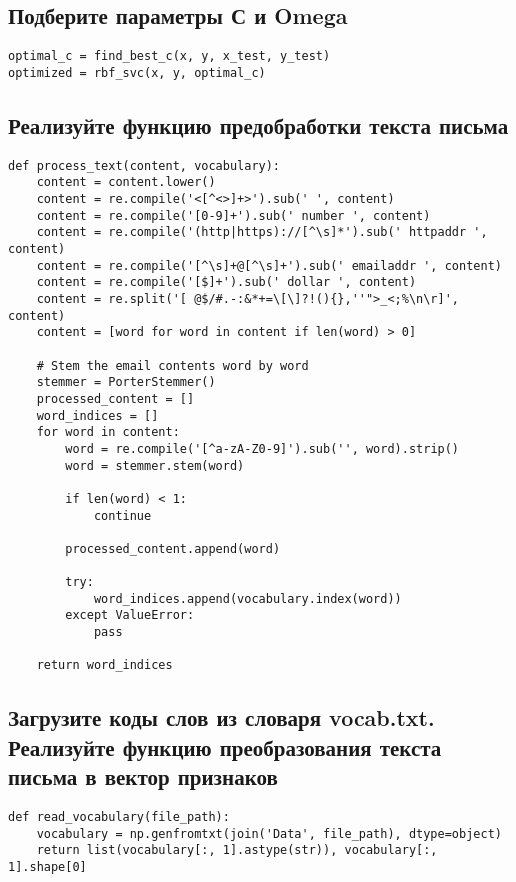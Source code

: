 \subsection{Подберите параметры С и Omega}

\begin{lstlisting}
optimal_c = find_best_c(x, y, x_test, y_test)
optimized = rbf_svc(x, y, optimal_c)
\end{lstlisting}


\subsection{Реализуйте функцию предобработки текста письма}

\begin{lstlisting}
def process_text(content, vocabulary):
    content = content.lower()
    content = re.compile('<[^<>]+>').sub(' ', content)
    content = re.compile('[0-9]+').sub(' number ', content)
    content = re.compile('(http|https)://[^\s]*').sub(' httpaddr ', content)
    content = re.compile('[^\s]+@[^\s]+').sub(' emailaddr ', content)
    content = re.compile('[$]+').sub(' dollar ', content)
    content = re.split('[ @$/#.-:&*+=\[\]?!(){},''">_<;%\n\r]', content)
    content = [word for word in content if len(word) > 0]

    # Stem the email contents word by word
    stemmer = PorterStemmer()
    processed_content = []
    word_indices = []
    for word in content:
        word = re.compile('[^a-zA-Z0-9]').sub('', word).strip()
        word = stemmer.stem(word)

        if len(word) < 1:
            continue

        processed_content.append(word)

        try:
            word_indices.append(vocabulary.index(word))
        except ValueError:
            pass

    return word_indices
\end{lstlisting}

\subsection{Загрузите коды слов из словаря vocab.txt. Реализуйте функцию преобразования текста письма в вектор признаков}

\begin{lstlisting}
def read_vocabulary(file_path):
    vocabulary = np.genfromtxt(join('Data', file_path), dtype=object)
    return list(vocabulary[:, 1].astype(str)), vocabulary[:, 1].shape[0]
\end{lstlisting}    

